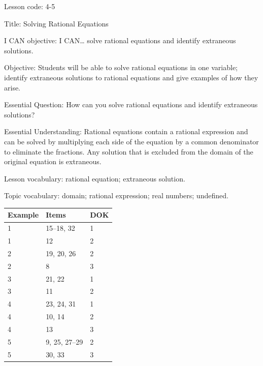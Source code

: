 \documentclass{article}
\newenvironment{lesson-meta}{}{}        %
\newenvironment{item-analysis}{}{}      %
\begin{document}
\begin{lesson-meta}
Lesson code: 4-5

Title: Solving Rational Equations

I CAN objective: I CAN\ldots{} solve rational equations and identify extraneous solutions.

Objective: Students will be able to solve rational equations in one variable; identify extraneous solutions to rational equations and give examples of how they arise.

Essential Question: How can you solve rational equations and identify extraneous solutions?

Essential Understanding: Rational equations contain a rational expression and can be solved by multiplying each side of the equation by a common denominator to eliminate the fractions. Any solution that is excluded from the domain of the original equation is extraneous.

Lesson vocabulary: rational equation; extraneous solution.

Topic vocabulary: domain; rational expression; real numbers; undefined.
\end{lesson-meta}

\begin{item-analysis}
\begin{tabular}{lll}
\toprule
Example & Items & DOK \\
\midrule
1 & 15--18, 32 & 1 \\
1 & 12 & 2 \\
2 & 19, 20, 26 & 2 \\
2 & 8 & 3 \\
3 & 21, 22 & 1 \\
3 & 11 & 2 \\
4 & 23, 24, 31 & 1 \\
4 & 10, 14 & 2 \\
4 & 13 & 3 \\
5 & 9, 25, 27--29 & 2 \\
5 & 30, 33 & 3 \\
\bottomrule
\end{tabular}
\end{item-analysis}
\end{document}
